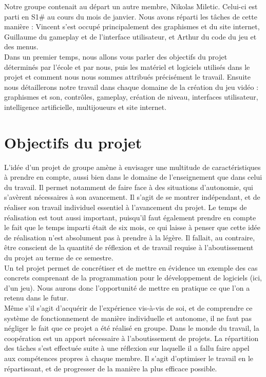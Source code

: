 \documentclass[12pt, titlepage]{article}
\begin{document}
\begin{spacing}{1.5}
Notre groupe contenait au départ un autre membre, Nikolas Miletic. Celui-ci est parti en S1\# au cours du mois de janvier. Nous avons réparti les tâches de cette manière : Vincent s'est occupé principalement des graphismes et du site internet, Guillaume du gameplay et de l’interface utilisateur, et Arthur du code du jeu et des menus.\\

Dans un premier temps, nous allons vous parler des objectifs du projet déterminés par l'école et par nous, puis les matériel et logiciels utilisés dans le projet et comment nous nous sommes attribués précisément le travail. Ensuite nous détaillerons notre travail dans chaque domaine de la création du jeu vidéo : graphismes et son, contrôles, gameplay, création de niveau, interfaces utilisateur, intelligence artificielle, multijoueurs et site internet.

\newpage
\section{Objectifs du projet}

L'idée d'un projet de groupe amène à envisager une multitude de caractéristiques à prendre en compte, aussi bien dans le domaine de l'enseignement que dans celui du travail. Il permet notamment de faire face à des situations d'autonomie, qui s'avèrent nécessaires à son avancement. Il s'agit de se montrer indépendant, et de réaliser son travail individuel essentiel à l'avancement du projet. Le temps de réalisation est tout aussi important, puisqu'il faut également prendre en compte le fait que le temps imparti était de six mois, ce qui laisse à penser que cette idée de réalisation n'est absolument pas à prendre à la légère. Il fallait, au contraire, être conscient de la quantité de réflexion et de travail requise à l'aboutissement du projet au terme de ce semestre.\\

Un tel projet permet de concrétiser et de mettre en évidence un exemple des cas concrets comprenant de la programmation pour le développement de logiciels (ici, d’un jeu). Nous aurons donc l'opportunité de mettre en pratique ce que l’on a retenu dans le futur.\\

Même s'il s'agit d'acquérir de l'expérience vis-à-vis de soi, et de comprendre ce système de fonctionnement de manière individuelle et autonome, il ne faut pas négliger le fait que ce projet a été réalisé en groupe. Dans le monde du travail, la coopération est un apport nécessaire à l'aboutissement de projets. La répartition des tâches s’est effectuée suite à une réflexion sur laquelle il a fallu faire appel aux compétences propres à chaque membre. Il s'agit d'optimiser le travail en le répartissant, et de progresser de la manière la plus efficace possible.\\


\end{spacing}
\end{document}
